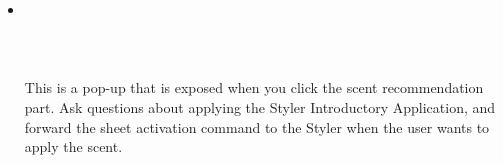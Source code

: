 \documentclass[conference]{IEEEtran}
\begin{document}
\begin{enumerate}
\begin{itemize}
        \item[] \\ \\ \\ \\ This is a pop-up that is exposed when you click the scent recommendation part. Ask questions about applying the Styler Introductory Application, and forward the sheet activation command to the Styler when the user wants to apply the scent.\\\\\\\\\\\\\\\\\\\\\\\\\\\\\\\\\\\\\\\\\\\\\\\\\\\\\\\\\\\\\\\\
    \end{itemize}
\end{enumerate}

\break
\end{document}

